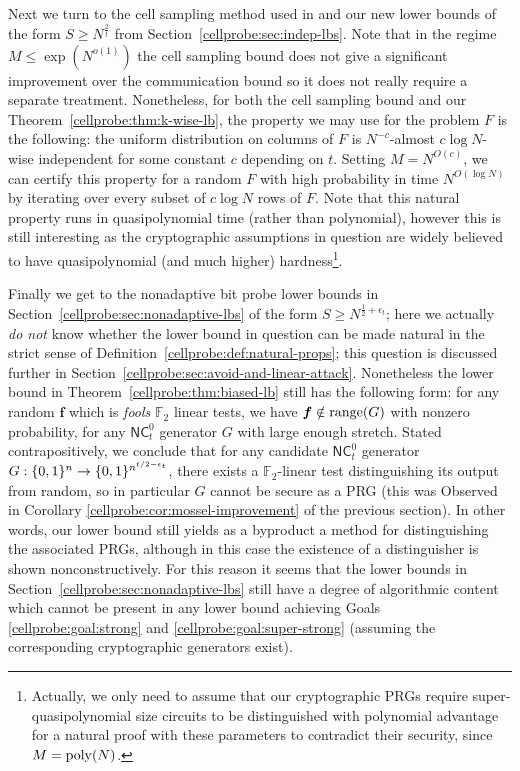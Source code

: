 Next we turn to the cell sampling method used in \cite{Siegel89,Siegel04,panigrahy,kasper} and our new lower bounds of the form $S \geq N^{\frac{2}{t}}$ from Section~\ref{cellprobe:sec:indep-lbs}. Note that in the regime $M \leq \exp(N^{o(1)})$ the cell sampling bound does not give a significant improvement over the communication bound so it does not really require a separate treatment. Nonetheless, for both the cell sampling bound and our Theorem~\ref{cellprobe:thm:k-wise-lb}, the property we may use for the problem $F$ is the following: the uniform distribution on columns of $F$ is $N^{-c}$-almost $c\log N$-wise independent for some constant $c$ depending on $t$. Setting $M = N^{O(c)}$, we can certify this property for a random $F$ with high probability in time $N^{O(\log N)}$ by iterating over every subset of $c \log N$ rows of $F$. Note that this natural property runs in quasipolynomial time (rather than polynomial), however this is still interesting as the cryptographic assumptions in question are widely believed to have quasipolynomial (and much higher) hardness\footnote{Actually, we only need to assume that our cryptographic PRGs require super-quasipolynomial size circuits to be distinguished with polynomial advantage for a natural proof with these parameters to contradict their security, since $M = \mathrm{poly}(N)$.}.

Finally we get to the nonadaptive bit probe lower bounds in Section~\ref{cellprobe:sec:nonadaptive-lbs} of the form $S \geq N^{\frac{1}{2} + \epsilon_t}$; here we actually \emph{do not} know whether the lower bound in question can be made natural in the strict sense of Definition~\ref{cellprobe:def:natural-props}; this question is discussed further in Section~\ref{cellprobe:sec:avoid-and-linear-attack}. 
Nonetheless the lower bound in Theorem~\ref{cellprobe:thm:biased-lb} still has the following form: for any random $\bm{f}$ which is \emph{fools} $\mathbb{F}_2$ linear tests, we have $\bm{f} \notin \mathrm{range}(G)$ with nonzero probability, for any $\mathsf{NC}^0_t$ generator $G$ with large enough stretch. Stated contrapositively, we conclude that for any candidate $\mathsf{NC}^0_t$ generator $G: \{0,1\}^n \to \{0,1\}^{n^{t/2-\epsilon_t}}$, there exists a $\mathbb{F}_2$-linear test distinguishing its output from random, so in particular $G$ cannot be secure as a PRG (this was Observed in Corollary \ref{cellprobe:cor:mossel-improvement} of the previous section). In other words, our lower bound still yields as a byproduct a method for distinguishing the associated PRGs, although in this case the existence of a distinguisher is shown nonconstructively.
For this reason it seems that the lower bounds in Section~\ref{cellprobe:sec:nonadaptive-lbs} still have a degree of algorithmic content which cannot be present in any lower bound achieving Goals \ref{cellprobe:goal:strong} and \ref{cellprobe:goal:super-strong} (assuming the corresponding cryptographic generators exist). 

